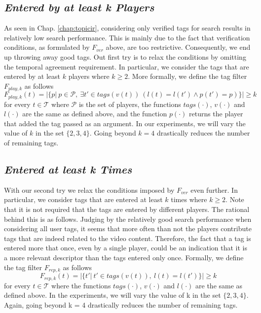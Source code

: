 \subsection{\textit{Entered by at least \textbf{k} Players}}
As seen in Chap. \ref{chap:topicir}, considering only verified tags for search results in relatively low search performance. This is mainly due to the fact that verification conditions, as formulated by $F_{ver}$ above, are too restrictive. Consequently, we end up throwing away good tags. Out first try is to relax the conditions by omitting the temporal agreement requirement. In particular, we consider the tags that are entered by at least $k$ players where $k\geq2$. More formally, we define the tag filter $F_{play,k}$ as follows
\begin{equation}
F_{play,k}(t) = |\{p|~p \in \mathcal{P},~\exists t' \in tags(v(t))~(l(t) = l(t') \wedge p(t') = p)\}| \geq k 
\end{equation}
for every $t \in \mathcal{T}$ where $\mathcal{P}$ is the set of players, the functions $tags(\cdot)$, $v(\cdot)$ and $l(\cdot)$ are the same as defined above, and the function $p(\cdot)$ returns the player that added the tag passed as an argument. In our experiments, we will vary the value of $k$ in the set $\{2,3,4\}$. Going beyond $k=4$ drastically reduces the number of remaining tags.
 
\subsection{\textit{Entered at least \textbf{k} Times}}
With our second try we relax the conditions imposed by $F_{ver}$ even further. In particular, we consider tags that are entered at least $k$ times where $k\geq2$. Note that it is not required that the tags are entered by different players. The rational behind this is as follows. Judging by the relatively good search performance when considering all user tags, it seems that more often than not the players contribute tags that are indeed related to the video content. Therefore, the fact that a tag is entered more that once, even by a single player, could be an indication that it is a more relevant descriptor than the tags entered only once. Formally, we define the tag filter $F_{rep,k}$ as follows
\begin{equation}
F_{rep,k}(t) = |\{t'|~t' \in tags(v(t)),~l(t) = l(t')\}| \geq k
\end{equation}
for every $t \in \mathcal{T}$ where the functions $tags(\cdot)$, $v(\cdot)$ and $l(\cdot)$ are the same as defined above. In the experiments, we will vary the value of k in the set $\{2, 3, 4\}$. Again, going beyond k = 4 drastically reduces the number of remaining tags.

